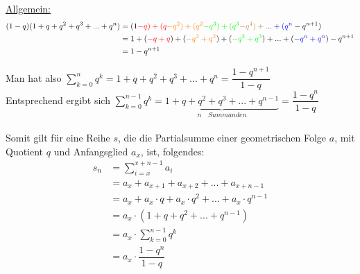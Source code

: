 \documentclass[main.tex]{subfiles}
\begin{document}
\begin{Beweis}
\underline{Allgemein:}
\begin{align*}
(1-q)(1+q+q^2+q^3+...+q^n)&=(1\textcolor{red}{-q)+(q}\textcolor{orange}{-q^2)+(q^2}\textcolor{green}{-q^3)+(q^3}\textcolor{brown}{-q^4)+.}.\textcolor{blue}{.+(q^n}-q^{n+1})\\
&=1+(\textcolor{red}{-q+q})+(\textcolor{orange}{-q^2+q^2})+(\textcolor{green}{-q^3+q^3})+...+(\textcolor{blue}{-q^n+q^n})-q^{n+1}\\
&=1-q^{n+1}\\
\end{align*}

Man hat also $\sum\limits_{k=0}^nq^k=1+q+q^2+q^3+...+q^n=\dfrac{1-q^{n+1}}{1-q}$\\
Entsprechend ergibt sich $\sum\limits_{k=0}^{n-1}q^k=\underbrace{1+q+q^2+q^3+...+q^{n-1}}_{n\quad Summanden}=\dfrac{1-q^n}{1-q}$\\
\\
Somit gilt für eine Reihe $s$, die die Partialsumme einer geometrischen Folge $a$, mit Quotient $q$ und Anfangsglied $a_{x}$, ist, folgendes:\\
\begin{align*}
s_{n}&=\sum\limits_{i=x}^{x+n-1}a_{i}\\
&=a_{x}+a_{x+1}+a_{x+2}+...+a_{x+n-1}\\
&=a_{x}+a_{x}\cdot q+a_{x}\cdot q^{2}+...+a_{x}\cdot q^{n-1}\\
&=a_{x}\cdot(1+q+q^2+...+q^{n-1})\\
&=a_{x}\cdot \sum\limits_{k=0}^{n-1}q^k\\
&=a_{x}\cdot \dfrac{1-q^{n}}{1-q}
\end{align*}
\end{Beweis}
\end{document}
